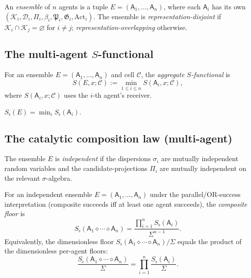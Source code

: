\documentclass[11pt,twocolumn,a4paper]{article}
\newcommand{\K}{\mathcal{K}}
\newcommand{\D}{\mathcal{D}}
\newcommand{\Cell}{\mathcal{C}}
\newcommand{\Method}{\mathfrak{P}}
\newcommand{\Goal}{\mathfrak{G}}
\newcommand{\agent}{\mathsf{A}}
\newcommand{\Sfloor}{S_{\flat}}
\newcommand{\Action}{\mathrm{Act}}
\newcommand{\Compose}{\diamond}
\begin{document}
\begin{definition}\label{def:ensemble}
An \emph{ensemble} of $n$ agents is a tuple
$E=(\agent_1,\dots,\agent_n)$, where each $\agent_i$ has its own
$(\K_i,\D_i,\Pi_i,\beta_i,\Method_i,\Goal_i,\Action_i)$. The ensemble
is \emph{representation-disjoint} if $\K_i\cap\K_j=\varnothing$ for
$i\ne j$; \emph{representation-overlapping} otherwise.
\end{definition}

\subsection{The multi-agent $S$-functional}

\begin{definition}\label{def:multi-S}
For an ensemble $E=(\agent_1,\dots,\agent_n)$ and cell $\Cell$, the
\emph{aggregate $S$-functional} is
\[
S(E,x;\Cell):=\min_{1\le i\le n}S(\agent_i,x;\Cell),
\]
where $S(\agent_i,x;\Cell)$ uses the $i$-th agent's receiver.
\end{definition}

\begin{proposition}\label{prop:agg-floor}
$\Sfloor(E)=\min_i\Sfloor(\agent_i)$.
\end{proposition}

\subsection{The catalytic composition law (multi-agent)}

\begin{definition}\label{def:indep}
The ensemble $E$ is \emph{independent} if the dispersions
$\sigma_i$ are mutually independent random variables and the
candidate-projections $\Pi_i$ are mutually independent on the relevant
$\sigma$-algebra.
\end{definition}

\begin{theorem}\label{thm:multi-cat}
For an independent ensemble $E=(\agent_1,\dots,\agent_n)$ under the
parallel/OR-success interpretation (composite succeeds iff at least
one agent succeeds), the \emph{composite floor} is
\[
\Sfloor(\agent_1\Compose\cdots\Compose\agent_n)
=\frac{\prod_{i=1}^n\Sfloor(\agent_i)}{\Sigma^{n-1}}.
\]
Equivalently, the dimensionless floor
$\Sfloor(\agent_1\Compose\cdots\Compose\agent_n)/\Sigma$ equals the
product of the dimensionless per-agent floors:
\[
\frac{\Sfloor(\agent_1\Compose\cdots\Compose\agent_n)}{\Sigma}
=\prod_{i=1}^n\frac{\Sfloor(\agent_i)}{\Sigma}.
\]
\end{theorem}
\end{document}

